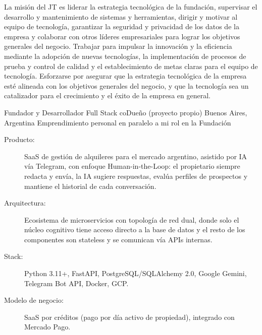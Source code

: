 {	La misión del JT es liderar la estrategia tecnológica de la fundación, supervisar el desarrollo y mantenimiento de sistemas y herramientas, dirigir y motivar al equipo de tecnología, garantizar la seguridad y privacidad de los datos de la empresa y colaborar con otros líderes empresariales para lograr los objetivos generales del negocio. Trabajar para impulsar la innovación y la eficiencia mediante la adopción de nuevas tecnologías, la implementación de procesos de prueba y control de calidad y el establecimiento de metas claras para el equipo de tecnología. Esforzarse por asegurar que la estrategia tecnológica de la empresa esté alineada con los objetivos generales del negocio, y que la tecnología sea un catalizador para el crecimiento y el éxito de la empresa en general.
	}

	{Fundador y Desarrollador Full Stack}
	{coDueño (proyecto propio)}
	{Buenos Aires, Argentina}
	{Emprendimiento personal en paralelo a mi rol en la Fundación}
	{\begin{description}
	\item[Producto:] SaaS de gestión de alquileres para el mercado argentino, asistido por IA vía Telegram, con enfoque Human-in-the-Loop: el propietario siempre redacta y envía, la IA sugiere respuestas, evalúa perfiles de prospectos y mantiene el historial de cada conversación.
	\item[Arquitectura:] Ecosistema de microservicios con topología de red dual, donde solo el núcleo cognitivo tiene acceso directo a la base de datos y el resto de los componentes son stateless y se comunican vía APIs internas.
	\item[Stack:] Python 3.11+, FastAPI, PostgreSQL/SQLAlchemy 2.0, Google Gemini, Telegram Bot API, Docker, GCP.
	\item[Modelo de negocio:] SaaS por créditos (pago por día activo de propiedad), integrado con Mercado Pago.
	\end{description}}

